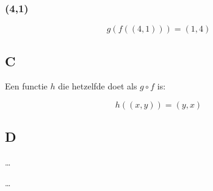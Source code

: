 \documentclass[11pt, a4paper]{article}
\begin{document}
\subsubsection*{(4,1)}
\[
	g(f((4,1))) = \boxed{(1, 4)}
\]


\subsection*{C}

Een functie $h$ die hetzelfde doet als $g \circ f$ is:

\[
	\boxed{h((x,y)) = (y,x)}
\]


\subsection*{D}
\ldots



\ldots
\end{document}

